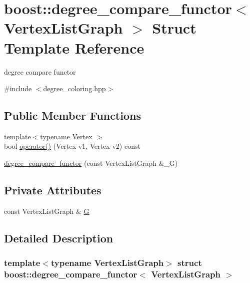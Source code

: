 \hypertarget{structboost_1_1degree__compare__functor}{}\section{boost\+:\+:degree\+\_\+compare\+\_\+functor$<$ Vertex\+List\+Graph $>$ Struct Template Reference}
\label{structboost_1_1degree__compare__functor}


degree compare functor  




{\ttfamily \#include $<$degree\+\_\+coloring.\+hpp$>$}

\subsection*{Public Member Functions}
\begin{DoxyCompactItemize}
\item 
{\footnotesize template$<$typename Vertex $>$ }\\bool \hyperlink{structboost_1_1degree__compare__functor_a206a1adfedbe3c8d8825f0936c77d3e5}{operator()} (Vertex v1, Vertex v2) const
\item 
\hyperlink{structboost_1_1degree__compare__functor_ad9e59df87abfd40629e25185aff580b2}{degree\+\_\+compare\+\_\+functor} (const Vertex\+List\+Graph \&\+\_\+G)
\end{DoxyCompactItemize}
\subsection*{Private Attributes}
\begin{DoxyCompactItemize}
\item 
const Vertex\+List\+Graph \& \hyperlink{structboost_1_1degree__compare__functor_a19f2346226e01fb5c3b0c6d3779303e5}{G}
\end{DoxyCompactItemize}


\subsection{Detailed Description}
\subsubsection*{template$<$typename Vertex\+List\+Graph$>$\newline
struct boost\+::degree\+\_\+compare\+\_\+functor$<$ Vertex\+List\+Graph $>$}

